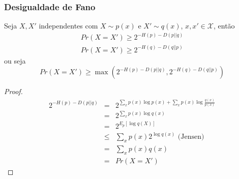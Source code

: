 \begin{frame}[allowframebreaks]
  \frametitle{Desigualdade de Fano}
  \begin{corollary}
  Seja $X, X'$ independentes com $X \sim p(x)$ e $X' \sim q(x)$, $x,x' \in \mathcal{X}$, então
  \begin{eqnarray}
  Pr(X=X') \geq 2^{-H(p) - D(p||q)} \nonumber \\
  Pr(X=X') \geq 2^{-H(q) - D(q||p)}
  \end{eqnarray} 
  ou seja
  \begin{equation}
  Pr(X=X') \geq \max \left( 2^{-H(p) - D(p||q)} , 2^{-H(q)-D(q||p)} \right)
  \end{equation}
  \end{corollary}

  \framebreak

  \begin{proof}
        \begin{eqnarray}
        2^{-H(p) - D(p||q)} &=& 2^{\sum_x p(x) \log p(x) + \sum_x p(x) \log \frac{q(x)}{p(x)}} \nonumber \\
                &=& 2^{\sum_x p(x) \log q(x)} \nonumber \\
                &=& 2^{E_p[\log q(X)]} \nonumber \\
                &\leq& \sum_x p(x) 2^{\log q(x)}  \text{ (Jensen)} \nonumber \\
                &=& \sum_x p(x) q(x) \nonumber \\
                &=& Pr(X=X')
        \end{eqnarray}
  \end{proof}
\end{frame}

